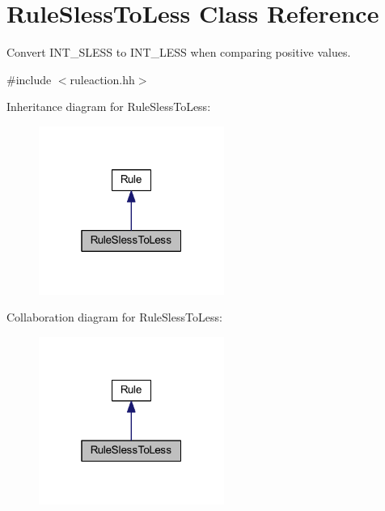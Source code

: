 \hypertarget{class_rule_sless_to_less}{}\section{Rule\+Sless\+To\+Less Class Reference}
\label{class_rule_sless_to_less}


Convert I\+N\+T\+\_\+\+S\+L\+E\+SS to I\+N\+T\+\_\+\+L\+E\+SS when comparing positive values.  




{\ttfamily \#include $<$ruleaction.\+hh$>$}



Inheritance diagram for Rule\+Sless\+To\+Less\+:
\nopagebreak
\begin{figure}[H]
\begin{center}
\leavevmode
\includegraphics[width=172pt]{class_rule_sless_to_less__inherit__graph}
\end{center}
\end{figure}


Collaboration diagram for Rule\+Sless\+To\+Less\+:
\nopagebreak
\begin{figure}[H]
\begin{center}
\leavevmode
\includegraphics[width=172pt]{class_rule_sless_to_less__coll__graph}
\end{center}
\end{figure}
